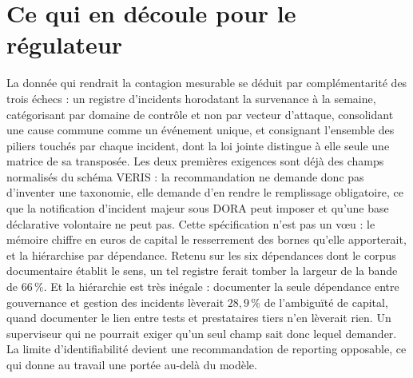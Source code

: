 
\section{Ce qui en découle pour le régulateur}
La donnée qui rendrait la contagion mesurable se déduit par complémentarité des trois échecs :
un registre d'incidents horodatant la survenance à la semaine, catégorisant par
domaine de contrôle et non par vecteur d'attaque, consolidant une cause commune
comme un événement unique, et consignant l'ensemble des piliers touchés par chaque incident,
dont la loi jointe distingue à elle seule une matrice de sa transposée. Les deux premières exigences sont déjà des champs normalisés du
schéma VERIS : la recommandation ne demande donc pas d'inventer une taxonomie, elle
demande d'en rendre le remplissage obligatoire, ce que la notification d'incident
majeur sous DORA peut imposer et qu'une base déclarative volontaire ne peut pas. Cette
spécification n'est pas un v\oe{}u : le mémoire chiffre en euros de capital le resserrement des
bornes qu'elle apporterait, et la hiérarchise par dépendance. Retenu sur les six dépendances dont
le corpus documentaire établit le sens, un tel registre ferait tomber la largeur de la bande de
$66\,\%$. Et la hiérarchie est très inégale : documenter la seule dépendance entre gouvernance et
gestion des incidents lèverait $28{,}9\,\%$ de l'ambiguïté de capital, quand documenter le lien
entre tests et prestataires tiers n'en lèverait rien. Un superviseur qui ne pourrait exiger qu'un
seul champ sait donc lequel demander. La limite d'identifiabilité
devient une recommandation de reporting opposable, ce qui donne au travail une portée
au-delà du modèle.


